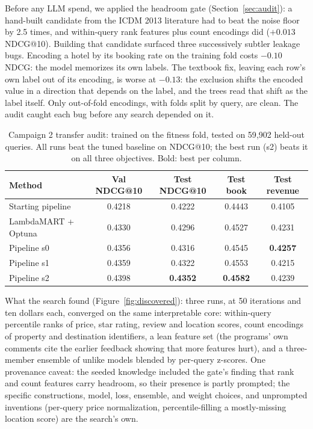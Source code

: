 \documentclass[]{ceurart}
\begin{document}
Before any LLM spend, we applied the headroom gate (Section~\ref{sec:audit}): a hand-built candidate
from the ICDM 2013 literature had to beat the noise floor by 2.5 times, and
within-query rank features plus count encodings did ($+0.013$ NDCG@10).
Building that candidate surfaced three successively subtler leakage bugs.
Encoding a hotel by its booking rate on the training fold costs $-0.10$
NDCG: the model memorizes its own labels. The textbook fix, leaving each
row's own label out of its encoding, is worse at $-0.13$: the exclusion
shifts the encoded value in a direction that depends on the label, and the
trees read that shift as the label itself. Only out-of-fold encodings, with
folds split by query, are clean. The audit caught each bug before any
search depended on it.

\begin{table}
  \caption{Campaign 2 transfer audit: trained on the fitness fold, tested on
  59{,}902 held-out queries. All runs beat the tuned baseline on NDCG@10; the
  best run (s2) beats it on all three objectives. Bold: best per column.}
  \label{tab:transfer}
  \begin{tabular}{lcccc}
    \toprule
    Method & Val NDCG@10 & Test NDCG@10 & Test book & Test revenue \\
    \midrule
    Starting pipeline & 0.4218 & 0.4222 & 0.4443 & 0.4105 \\
    LambdaMART + Optuna & 0.4330 & 0.4296 & 0.4527 & 0.4231 \\
    Pipeline s0 & 0.4356 & 0.4316 & 0.4545 & \textbf{0.4257} \\
    Pipeline s1 & 0.4359 & 0.4322 & 0.4553 & 0.4215 \\
    Pipeline s2 & 0.4398 & \textbf{0.4352} & \textbf{0.4582} & 0.4239 \\
    \bottomrule
  \end{tabular}
\end{table}

What the search found (Figure~\ref{fig:discovered}): three runs, at 50
iterations and ten dollars each, converged on the same interpretable core: within-query percentile
ranks of price, star rating, review and location scores, count encodings of
property and destination identifiers, a lean feature set (the programs' own comments cite the earlier feedback
showing that more features hurt), and a three-member ensemble of unlike
models blended by per-query z-scores. One provenance caveat: the seeded knowledge included the gate's finding
that rank and count features carry headroom, so their presence is partly
prompted; the specific constructions, model, loss, ensemble, and weight
choices, and unprompted inventions (per-query price normalization,
percentile-filling a mostly-missing location score) are the search's own.
\end{document}
